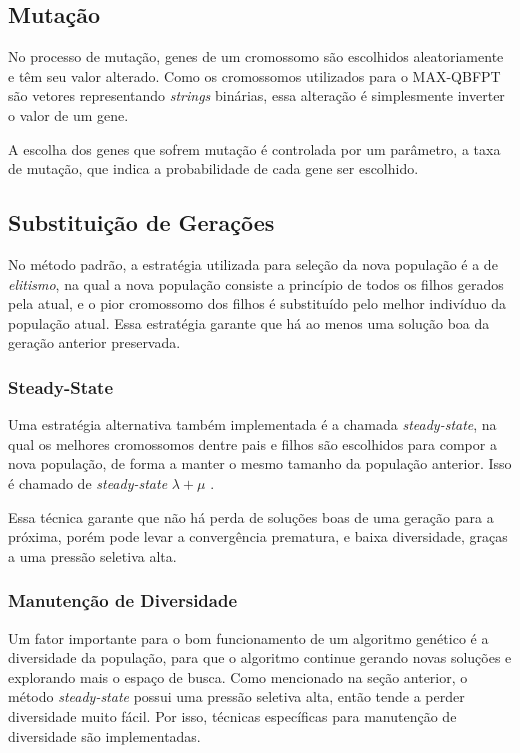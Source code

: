 \documentclass{MO824}
\begin{document}
\subsection{Mutação}
No processo de mutação, genes de um cromossomo são escolhidos aleatoriamente e têm seu valor alterado. Como os cromossomos utilizados para o MAX-QBFPT são vetores representando \textit{strings} binárias, essa alteração é simplesmente inverter o valor de um gene. 

A escolha dos genes que sofrem mutação é controlada por um parâmetro, a taxa de mutação, que indica a probabilidade de cada gene ser escolhido.

\subsection{Substituição de Gerações}
No método padrão, a estratégia utilizada para seleção da nova população é a de \textit{elitismo}, na qual a nova população consiste a princípio de todos os filhos gerados pela atual, e o pior cromossomo dos filhos é substituído pelo melhor indivíduo da população atual. Essa estratégia garante que há ao menos uma solução boa da geração anterior preservada.

\subsubsection{Steady-State}
Uma estratégia alternativa também implementada é a chamada \textit{steady-state}, na qual os melhores cromossomos dentre pais e filhos são escolhidos para compor a nova população, de forma a manter o mesmo tamanho da população anterior. Isso é chamado de \textit{steady-state} $\lambda + \mu$ \cite{ga}.

Essa técnica garante que não há perda de soluções boas de uma geração para a próxima, porém pode levar a convergência prematura, e baixa diversidade, graças a uma pressão seletiva alta.

\subsubsection{Manutenção de Diversidade}
Um fator importante para o bom funcionamento de um algoritmo genético é a diversidade da população, para que o algoritmo continue gerando novas soluções e explorando mais o espaço de busca. Como mencionado na seção anterior, o método \textit{steady-state} possui uma pressão seletiva alta, então tende a perder diversidade muito fácil. Por isso, técnicas específicas para manutenção de diversidade são implementadas. 
\end{document}
